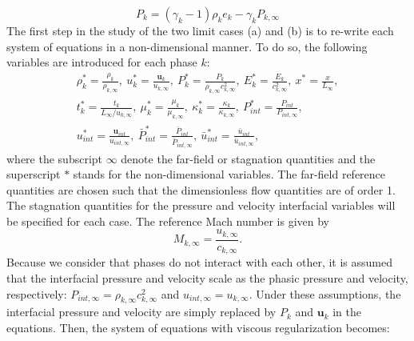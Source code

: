 \documentclass[preprint,10pt]{elsarticle}
\newcommand{\mbold}[1]{\boldsymbol#1}
\begin{document}
%
\begin{equation}\label{eq:SGEOS_bis}
P_k = \left( \gamma_k-1 \right) \rho_k e_k - \gamma_k P_{k,\infty}
\end{equation}
%
The first step in the study of the two limit cases (a) and (b) is to re-write each system of equations in a non-dimensional manner. To do so, the following variables are introduced for each phase $k$:
%
\begin{multline}
\label{eq:norm_param}
\rho_k^*   = \frac{\rho_k}{\rho_{k,\infty}}           ,\
u_k^*      = \frac{\mbold u_k}{u_{k,\infty}}                 ,\
P_k^*      = \frac{P_k}{\rho_{k,\infty} c^2_{k,\infty}}   ,\
E_k^*      = \frac{E_k}{c^2_{k,\infty} }              ,\
x^* = \frac{x}{L_\infty}                      ,\\
t_k^* = \frac{t_k}{L_\infty / u_{k,\infty}}           ,\
\mu_k^*    = \frac{\mu_k}{\mu_{k,\infty}}             ,\
\kappa_k^* = \frac{\kappa_k}{\kappa_{k,\infty}}       ,\
P_{int}^*    = \frac{P_{int}}{P_{int,\infty}}             ,\\
u_{int}^* = \frac{\mbold u_{int}}{u_{int,\infty}}       ,\
\bar{P}_{int}^*    = \frac{\bar{P}_{int}}{\bar{P}_{int,\infty}}             ,\
\bar{u}_{int}^* = \frac{\bar{u}_{int}}{\bar{u}_{int,\infty}}       ,\
\end{multline}
%
where  the subscript $\infty$ denote the far-field or stagnation quantities and the superscript $*$ stands for the non-dimensional variables. The far-field reference quantities are chosen such that the dimensionless flow quantities are of order 1. The stagnation quantities for the pressure and velocity interfacial variables will be specified for each case. The reference Mach number is given by
%
\begin{equation}
M_{k,\infty} = \frac{u_{k,\infty}}{c_{k,\infty}}.
\end{equation}
%
Because we consider that phases do not interact with each other, it is assumed that the interfacial pressure and velocity scale as the phasic pressure and velocity, respectively: $P_{int,\infty} = \rho_{k,\infty} c^2_{k,\infty}$ and $u_{int,\infty} = u_{k,\infty}$. Under these assumptions, the interfacial pressure and velocity are simply replaced by $P_k$ and $\mbold u_k$ in the equations. Then, the system of equations with viscous regularization becomes:
% 
\end{document}
